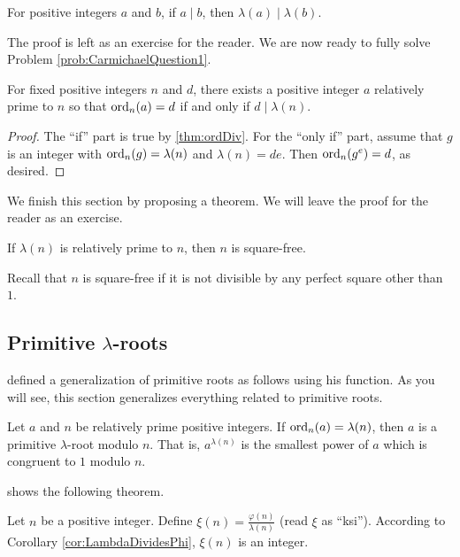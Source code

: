 \documentclass{subfile}
\begin{document}
	\begin{theorem}
		For positive integers $a$ and $b$, if $a \mid b$, then $\lambda(a) \mid \lambda(b)$.
	\end{theorem}
	The proof is left as an exercise for the reader. We are now ready to fully solve Problem \ref{prob:CarmichaelQuestion1}.
	\begin{theorem}
		For fixed positive integers $n$ and $d$, there exists a positive integer $a$  relatively prime to $n$ so that $\operatorname{ord}_n(a)=d$ if and only if $d \mid \lambda(n)$.
	\end{theorem}

	\begin{proof}
		The ``if'' part is true by \autoref{thm:ordDiv}. For the ``only if'' part, assume that $g$ is an integer with $\operatorname{ord}_n(g)=\lambda(n)$ and $\lambda(n)=de$. Then $\operatorname{ord}_n(g^e)=d$, as desired.
	\end{proof}

	We finish this section by proposing a theorem. We will leave the proof for the reader as an exercise.
		\begin{theorem}
			If $\lambda(n)$ is relatively prime to $n$, then $n$ is square-free.
		\end{theorem}
	Recall that $n$ is square-free if it is not divisible by any perfect square other than $1$.

	\subsection{Primitive \texorpdfstring{$\lambda$}{Lambda}-roots}
	\textcite[Page $232-233$, Result II]{carmichael_1910} defined a generalization of primitive roots as follows using his function. As you will see, this section generalizes everything related to primitive roots.
	\begin{definition}
		Let $a$ and $n$ be relatively prime positive integers. If $\operatorname{ord}_n(a)=\lambda(n)$, then $a$ is a primitive $\lambda$-root modulo $n$. That is, $a^{\lambda(n)}$ is the smallest power of $a$ which is congruent to $1$ modulo $n$.
	\end{definition}
\textcite{cameron_preece_2014} shows the following theorem.
	\begin{definition}
		Let $n$ be a positive integer. Define $\xi(n) = \frac{\varphi(n)}{\lambda(n)}$ (read $\xi$ as ``ksi''). According to Corollary \ref{cor:LambdaDividesPhi}, $\xi(n)$ is an integer.
	\end{definition}
\end{document}
